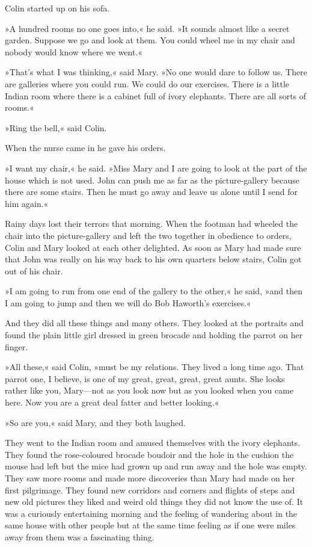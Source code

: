 Colin started up on his sofa.

»A hundred rooms no one goes into,« he said. »It sounds almost like a secret garden. Suppose we go and look at them. You could wheel me in my chair and nobody would know where we went.«

»That's what I was thinking,« said Mary. »No one would dare to follow us. There are galleries where you could run. We could do our exercises. There is a little Indian room where there is a cabinet full of ivory elephants. There are all sorts of rooms.«

»Ring the bell,« said Colin.

When the nurse came in he gave his orders.

»I want my chair,« he said. »Miss Mary and I are going to look at the part of the house which is not used. John can push me as far as the picture-gallery because there are some stairs. Then he must go away and leave us alone until I send for him again.«

Rainy days lost their terrors that morning. When the footman had wheeled the chair into the picture-gallery and left the two together in obedience to orders, Colin and Mary looked at each other delighted. As soon as Mary had made sure that John was really on his way back to his own quarters below stairs, Colin got out of his chair.

»I am going to run from one end of the gallery to the other,« he said, »and then I am going to jump and then we will do Bob Haworth's exercises.«

And they did all these things and many others. They looked at the portraits and found the plain little girl dressed in green brocade and holding the parrot on her finger.

»All these,« said Colin, »must be my relations. They lived a long time ago. That parrot one, I believe, is one of my great, great, great, great aunts. She looks rather like you, Mary—not as you look now but as you looked when you came here. Now you are a great deal fatter and better looking.«

»So are you,« said Mary, and they both laughed.

They went to the Indian room and amused themselves with the ivory elephants. They found the rose-coloured brocade boudoir and the hole in the cushion the mouse had left but the mice had grown up and run away and the hole was empty. They saw more rooms and made more discoveries than Mary had made on her first pilgrimage. They found new corridors and corners and flights of steps and new old pictures they liked and weird old things they did not know the use of. It was a curiously entertaining morning and the feeling of wandering about in the same house with other people but at the same time feeling as if one were miles away from them was a fascinating thing.

